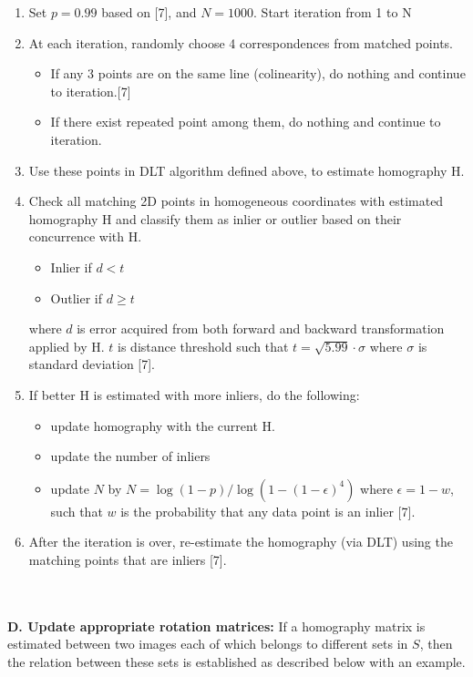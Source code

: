 \documentclass{article}
\begin{document}
\begin{enumerate}
\item Set $p = 0.99$ based on [7], and $N = 1000$. Start iteration from 1 to N
\item At each iteration, randomly choose 4 correspondences from matched points.
	\begin{itemize}
		\item If any 3 points are on the same line (colinearity), do nothing and continue to iteration.[7]
		\item If there exist repeated point among them, do nothing and continue to iteration.
	\end{itemize}
\item Use these points in DLT algorithm defined above, to estimate homography H.
\item Check all matching 2D points in homogeneous coordinates with estimated homography H and classify them as inlier or outlier based on their concurrence with H.
	\begin{itemize}
		\item Inlier if $ d < t$
		\item Outlier if $ d \geq t$
	\end{itemize}
where $d$ is error acquired from both forward and backward transformation applied by H. $t$ is distance threshold such that $ t = \sqrt{5.99} \cdot \sigma$ where $\sigma$ is standard deviation [7]. 
\item If better H  is estimated with more inliers, do the following:
\begin{itemize}
		\item update homography with the current H.
		\item update the number of inliers
		\item update $N$ by $N = \log(1-p) / \log(1-(1-\epsilon)^{4})$ where $\epsilon = 1-w$, such that $w$ is the probability that any data point is an inlier [7]. 
	\end{itemize}
\item After the iteration is over, re-estimate the homography (via DLT) using the matching points that are inliers [7].
\end{enumerate}
\ \\~\\
\textbf{D. Update appropriate rotation matrices:}
If a homography matrix is estimated between two images each of which belongs to different sets in $S$, then the relation between these sets is established as described below with an example.
\end{document}
